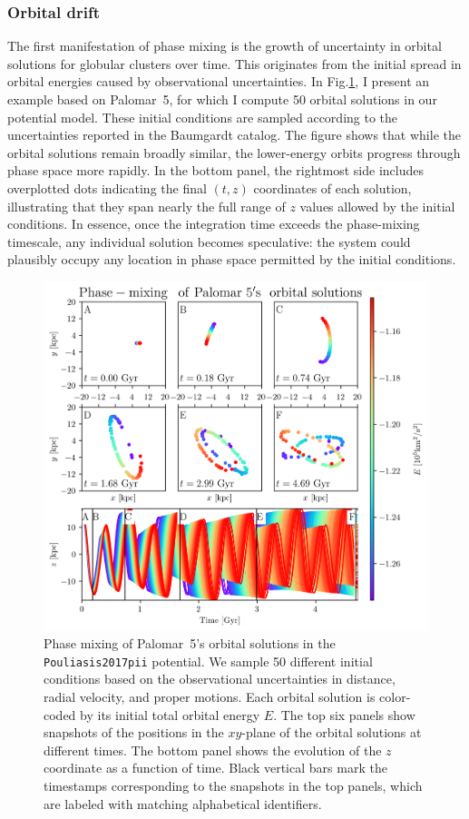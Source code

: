         \subsubsection{Orbital drift}
            The first manifestation of phase mixing is the growth of uncertainty in orbital solutions for globular clusters over time. This originates from the initial spread in orbital energies caused by observational uncertainties. In Fig.\ref{fig:phase_mixing_palomar_5_orbital_solutions}, I present an example based on Palomar~5, for which I compute 50 orbital solutions in our potential model. These initial conditions are sampled according to the uncertainties reported in the Baumgardt catalog. The figure shows that while the orbital solutions remain broadly similar, the lower-energy orbits progress through phase space more rapidly. In the bottom panel, the rightmost side includes overplotted dots indicating the final $(t, z)$ coordinates of each solution, illustrating that they span nearly the full range of $z$ values allowed by the initial conditions. In essence, once the integration time exceeds the phase-mixing timescale, any individual solution becomes speculative: the system could plausibly occupy any location in phase space permitted by the initial conditions.
            \begin{figure}
                \centering
                \includegraphics[width=\linewidth]{images/phase_mixing_palomar_5_orbital_solutions.png}
                \caption{Phase mixing of Palomar~5's orbital solutions in the \texttt{Pouliasis2017pii} potential. We sample 50 different initial conditions based on the observational uncertainties in distance, radial velocity, and proper motions. Each orbital solution is color-coded by its initial total orbital energy $E$. The top six panels show snapshots of the positions in the $xy$-plane of the orbital solutions at different times. The bottom panel shows the evolution of the $z$ coordinate as a function of time. Black vertical bars mark the timestamps corresponding to the snapshots in the top panels, which are labeled with matching alphabetical identifiers.}
                \label{fig:phase_mixing_palomar_5_orbital_solutions}
            \end{figure}
